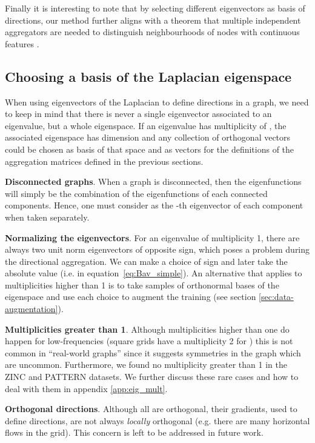 \documentclass{article} \usepackage{arxiv,times}
\def\eqref#1{equation~\ref{#1}}
\newcommand{\xhdr}[1]{{\noindent\bfseries #1}.}
\begin{document}
Finally it is interesting to note that by selecting different eigenvectors as basis of directions, our method further aligns with a theorem that multiple independent aggregators are needed to distinguish neighbourhoods of nodes with continuous features \cite{corso2020principal}.


\subsection{Choosing a basis of the Laplacian eigenspace}

When using eigenvectors of the Laplacian  to define directions in a graph, we need to keep in mind that there is never a single eigenvector associated to an eigenvalue, but a whole eigenspace.
If an eigenvalue has multiplicity of , the associated eigenspace has dimension  and any collection of  orthogonal vectors could be chosen as basis of that space and as vectors for the definitions of the aggregation matrices  defined in the previous sections.

\xhdr{Disconnected graphs} When a graph is disconnected, then the eigenfunctions will simply be the combination of the eigenfunctions of each connected components. Hence, one must consider  as the -th eigenvector of each component when taken separately.


\xhdr{Normalizing the eigenvectors} For an eigenvalue of multiplicity 1, there are always two unit norm eigenvectors of opposite sign, which poses a problem during the directional aggregation. We can make a choice of sign and later take the absolute value (i.e.  in \eqref{eq:Bav_simple}).
An alternative that applies to multiplicities higher than 1 is to take samples of orthonormal bases of the eigenspace and use each choice to augment the training (see section \ref{sec:data-augmentation}). 

\xhdr{Multiplicities greater than 1} Although multiplicities higher than one do happen for low-frequencies (square grids have a multiplicity 2 for ) this is not common in ``real-world graphs'' since it suggests symmetries in the graph which are uncommon. Furthermore,  we found no  multiplicity greater than 1 in the ZINC and PATTERN datasets. We further discuss these rare cases and how to deal with them in appendix \ref{app:eig_mult}.

\xhdr{Orthogonal directions} Although all  are orthogonal, their gradients, used to define directions, are not always \textit{locally} orthogonal (e.g. there are many horizontal flows in the grid).
This concern is left to be addressed in future work.
\end{document}
